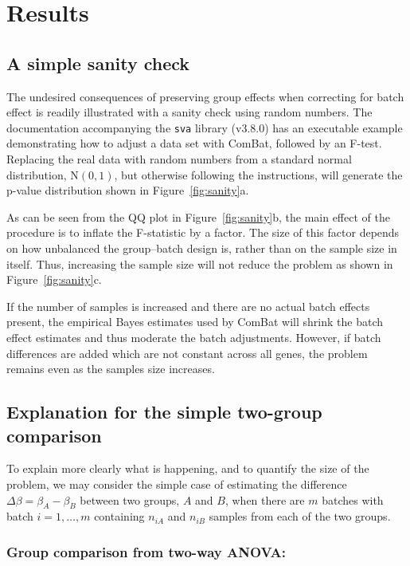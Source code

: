 \documentclass{bio}
\begin{document}
\section{Results}

\subsection{A simple sanity check}

The undesired consequences of preserving group effects when correcting for batch effect is readily illustrated with a sanity check using random numbers. The documentation accompanying the \texttt{sva} library (v3.8.0) has an executable example demonstrating how to adjust a data set with ComBat, followed by an F-test. Replacing the real data with random numbers from a standard normal distribution, $\text{N}(0,1)$, but otherwise following the instructions, will generate the p-value distribution shown in Figure~\ref{fig:sanity}a.

As can be seen from the QQ plot in Figure~\ref{fig:sanity}b, the main effect of the procedure is to inflate the F-statistic by a factor. The size of this factor depends on how unbalanced the group--batch design is, rather than on the sample size in itself. Thus, increasing the sample size will not reduce the problem as shown in Figure~\ref{fig:sanity}c.

If the number of samples is increased and there are no actual batch effects present, the empirical Bayes estimates used by ComBat will shrink the batch effect estimates and thus moderate the batch adjustments. However, if batch differences are added which are not constant across all genes, the problem remains even as the samples size increases.

\subsection{Explanation for the simple two-group comparison}
\label{sec:twogroups}

To explain more clearly what is happening, and to quantify the size of the problem, we may consider the simple case of estimating the difference $\Delta\beta=\beta_A-\beta_B$ between two groups, $A$ and $B$, when there are $m$ batches with batch $i=1,\ldots,m$ containing $n_{iA}$ and $n_{iB}$ samples from each of the two groups.

\subsubsection{Group comparison from two-way ANOVA:}
\end{document}
